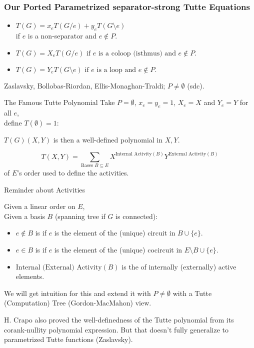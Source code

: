 \documentclass{beamer}
\begin{document}
\begin{frame}
\frametitle{Our Ported Parametrized {\small separator-strong} Tutte Equations}
\begin{itemize}
\item
$T(G)=x_eT(G/e)+y_eT(G\setminus e)$\\  
if  $e$ is a non-separator and  $e\not\in P$.
\item
$T(G)=X_eT(G/e) \text{ if } e 
\text{ is a coloop (isthmus) and } e\not\in P.$
\item
$T(G)=Y_eT(G\setminus e) \text{ if } e
\text{ is a loop and } e\not\in P.$
\end{itemize}
Zaslavsky, Bollobas-Riordan, Ellis-Monaghan-Traldi;
$P\neq \emptyset$ (sdc).

\begin{block}{The Famous Tutte Polynomial}
Take $P=\emptyset$, $x_e=y_e=1$, $X_e=X$ and $Y_e=Y$ for
all $e$,\\
define $T(\emptyset)=1$:

$T(G)(X,Y)$ is then a well-defined polynomial in $X,Y$.
\end{block}

\begin{theorem}
\[
T(X,Y)=\sum_{\text{Bases }B\subseteq E}
X^{\text{Internal Activity}(B)}
Y^{\text{External Activity}(B)}
\]
 of $E$'s order used to define
the activities.
\end{theorem}
\end{frame}

\begin{frame}{Reminder about Activities}

Given a linear order on $E$,\\
\hspace{0.5in}Given a basis $B$ (spanning tree if $G$ is connected):
\begin{itemize}
\item $e\not\in B$ is  if $e$ is the 
 element of the (unique) circuit in 
$B\cup\{e\}$.
\item $e\in B$ is  if $e$ is the 
 element of the (unique) cocircuit in 
$E\setminus B\cup\{e\}$.
\item $\text{Internal (External) Activity}(B)$ is the 
 of internally (externally) active elements.
\end{itemize}

We will get intuition for this and extend it with $P\neq\emptyset$
with a Tutte (Computation) Tree (Gordon-MacMahon) view.

\vfill
H. Crapo also proved the well-definedness of the
Tutte polynomial from its corank-nullity polynomial 
expression.  But that doesn't fully generalize to
parametrized Tutte functions (Zaslavsky).

\end{frame}
\end{document}
